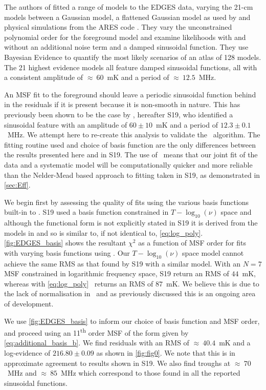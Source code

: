The authors of \cite{Sims2020} fitted a range of models to the EDGES data, varying the 21-cm models between a Gaussian model, a flattened Gaussian model as used by \cite{Bowman_edges_2018} and physical simulations from the ARES code \citep{ARES_sim}. They vary the unconstrained polynomial order for the foreground model and examine likelihoods with and without an additional noise term and a damped sinusoidal function. They use Bayesian Evidence to quantify the most likely scenarios of an atlas of 128 models. The 21 highest evidence models all feature damped sinusoidal functions, all with a consistent amplitude of $\approx~60$~mK and a period of $\approx~12.5$~MHz.

An MSF fit to the foreground should leave a periodic sinusoidal function behind in the residuals if it is present because it is non-smooth in nature. This has previously been shown to be the case by \cite{Singh_edges_2019}, hereafter S19, who identified a sinusoidal feature with an amplitude of $60 \pm 10$~mK and a period of $12.3 \pm 0.1$~MHz. We attempt here to re-create this analysis to validate the \maxsmooth~algorithm. The fitting routine used and choice of basis function are the only differences between the results presented here and in S19. The use of \maxsmooth~means that our joint fit of the data and a systematic model will be computationally quicker and more reliable than the Nelder-Mead based approach to fitting taken in S19, as demonstrated in \cref{sec:Eff}.

We begin first by assessing the quality of fits using the various basis functions built-in to \maxsmooth. S19 used a basis function constrained in $T - \log_{10}(\nu)$ space and although the functional form is not explicitly stated in S19 it is derived from the models in \cite{Sathyanarayana_msf_2017} and so is similar to, if not identical to, \cref{eq:log_poly}. \cref{fig:EDGES_basis} shows the resultant $\chi^2$ as a function of MSF order for fits with varying basis functions using \maxsmooth. %
Our $T - \log_{10}(\nu)$ space model cannot achieve the same RMS as that found by S19 with a similar model. With an $N = 7$ MSF constrained in logarithmic frequency space, S19 return an RMS of $44$~mK, whereas with \cref{eq:log_poly} \maxsmooth~returns an RMS of $87$~mK. We believe this is due to the lack of normalisation in \maxsmooth~and as previously discussed this is an ongoing area of development.

We use \cref{fig:EDGES_basis} to inform our choice of basis function and MSF order, and proceed using an 11\textsuperscript{th} order MSF of the form given by \cref{eq:additional_basis_b}. We find residuals with an RMS of $\approx~40.4$~mK and a log-evidence of $216.80\pm 0.09$ as shown in \cref{fig:fig0}. We note that this is in approximate agreement to results shown in S19. We also find troughs at $\approx~70$~MHz and $\approx~85$~MHz which correspond to those found in all the reported sinusoidal functions.

